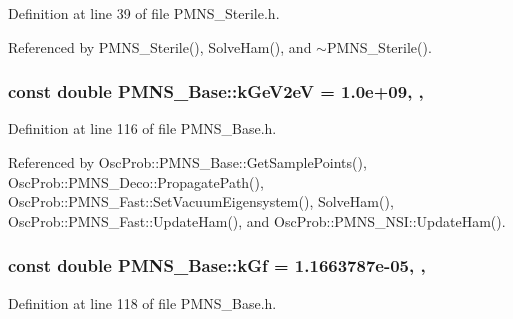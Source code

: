 Definition at line 39 of file P\+M\+N\+S\+\_\+\+Sterile.\+h.



Referenced by P\+M\+N\+S\+\_\+\+Sterile(), Solve\+Ham(), and $\sim$\+P\+M\+N\+S\+\_\+\+Sterile().

\subsubsection[{\texorpdfstring{k\+Ge\+V2eV}{kGeV2eV}}]{\setlength{\rightskip}{0pt plus 5cm}const double P\+M\+N\+S\+\_\+\+Base\+::k\+Ge\+V2eV = 1.\+0e+09\hspace{0.3cm}{\ttfamily [static]}, {\ttfamily [protected]}, {\ttfamily [inherited]}}\hypertarget{classOscProb_1_1PMNS__Base_ad36a0a6bf58d6ec093d3947784bd89e9}{}\label{classOscProb_1_1PMNS__Base_ad36a0a6bf58d6ec093d3947784bd89e9}


Definition at line 116 of file P\+M\+N\+S\+\_\+\+Base.\+h.



Referenced by Osc\+Prob\+::\+P\+M\+N\+S\+\_\+\+Base\+::\+Get\+Sample\+Points(), Osc\+Prob\+::\+P\+M\+N\+S\+\_\+\+Deco\+::\+Propagate\+Path(), Osc\+Prob\+::\+P\+M\+N\+S\+\_\+\+Fast\+::\+Set\+Vacuum\+Eigensystem(), Solve\+Ham(), Osc\+Prob\+::\+P\+M\+N\+S\+\_\+\+Fast\+::\+Update\+Ham(), and Osc\+Prob\+::\+P\+M\+N\+S\+\_\+\+N\+S\+I\+::\+Update\+Ham().

\subsubsection[{\texorpdfstring{k\+Gf}{kGf}}]{\setlength{\rightskip}{0pt plus 5cm}const double P\+M\+N\+S\+\_\+\+Base\+::k\+Gf = 1.\+1663787e-\/05\hspace{0.3cm}{\ttfamily [static]}, {\ttfamily [protected]}, {\ttfamily [inherited]}}\hypertarget{classOscProb_1_1PMNS__Base_a7f26a3456128234b2ae6cc9141a6532f}{}\label{classOscProb_1_1PMNS__Base_a7f26a3456128234b2ae6cc9141a6532f}


Definition at line 118 of file P\+M\+N\+S\+\_\+\+Base.\+h.



